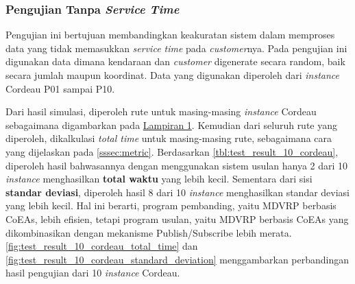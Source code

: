 \subsubsection{Pengujian Tanpa \textit{Service Time}}
Pengujian ini bertujuan membandingkan keakuratan sistem dalam memproses data yang tidak memasukkan \textit{service time} pada \textit{customer}nya. Pada pengujian ini digunakan data dimana kendaraan dan \textit{customer} digenerate secara random, baik secara jumlah maupun koordinat. Data yang digunakan diperoleh dari \textit{instance} Cordeau P01 sampai P10.


Dari hasil simulasi, diperoleh rute untuk masing-masing \textit{instance} Cordeau sebagaimana digambarkan pada \hyperref[ch:test_result_cordeau_notw]{Lampiran 1}. Kemudian dari seluruh rute yang diperoleh, dikalkulasi \textit{total time} untuk masing-masing rute, sebagaimana cara yang dijelaskan pada \autoref{sssec:metric}. Berdasarkan \autoref{tbl:test_result_10_cordeau}, diperoleh hasil bahwasannya dengan menggunakan sistem usulan hanya 2 dari 10 \textit{instance} menghasilkan \textbf{total waktu} yang lebih kecil. Sementara dari sisi \textbf{standar deviasi}, diperoleh hasil 8 dari 10 \textit{instance} menghasilkan standar deviasi yang lebih kecil. Hal ini berarti, program pembanding, yaitu MDVRP berbasis CoEAs, lebih efisien, tetapi program usulan, yaitu MDVRP berbasis CoEAs yang dikombinasikan dengan mekanisme Publish/Subscribe lebih merata. \autoref{fig:test_result_10_cordeau_total_time} dan \autoref{fig:test_result_10_cordeau_standard_deviation} menggambarkan perbandingan hasil pengujian dari 10 \textit{instance} Cordeau.


\newcommand\MyHead[2]{%
	\multicolumn{1}{l}{\parbox{#1}{\centering #2}}
}


